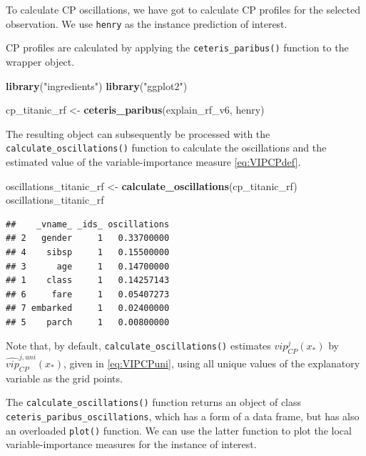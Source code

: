 \documentclass[12pt,]{krantz}
\newenvironment{Shaded}{\begin{snugshade}}{\end{snugshade}}
\newcommand{\KeywordTok}[1]{\textcolor[rgb]{0.13,0.29,0.53}{\textbf{#1}}}
\newcommand{\NormalTok}[1]{#1}
\newcommand{\StringTok}[1]{\textcolor[rgb]{0.31,0.60,0.02}{#1}}
\begin{document}
To calculate CP oscillations, we have got to calculate CP profiles for the selected observation. We use \texttt{henry} as the instance prediction of interest.

CP profiles are calculated by applying the \texttt{ceteris\_paribus()} function to the wrapper object.

\begin{Shaded}
\begin{Highlighting}[]
\KeywordTok{library}\NormalTok{(}\StringTok{"ingredients"}\NormalTok{)}
\KeywordTok{library}\NormalTok{(}\StringTok{"ggplot2"}\NormalTok{)}

\NormalTok{cp_titanic_rf <-}\StringTok{ }\KeywordTok{ceteris_paribus}\NormalTok{(explain_rf_v6, henry)}
\end{Highlighting}
\end{Shaded}

The resulting object can subsequently be processed with the \texttt{calculate\_oscillations()} function to calculate the oscillations and the estimated value of the variable-importance measure \eqref{eq:VIPCPdef}.

\begin{Shaded}
\begin{Highlighting}[]
\NormalTok{oscillations_titanic_rf <-}\StringTok{ }\KeywordTok{calculate_oscillations}\NormalTok{(cp_titanic_rf)}
\NormalTok{oscillations_titanic_rf}
\end{Highlighting}
\end{Shaded}

\begin{verbatim}
##    _vname_ _ids_ oscillations
## 2   gender     1   0.33700000
## 4    sibsp     1   0.15500000
## 3      age     1   0.14700000
## 1    class     1   0.14257143
## 6     fare     1   0.05407273
## 7 embarked     1   0.02400000
## 5    parch     1   0.00800000
\end{verbatim}

Note that, by default, \texttt{calculate\_oscillations()} estimates \(vip_{CP}^j(x_*)\) by \(\widehat{vip}_{CP}^{j,uni}(x_*)\), given in \eqref{eq:VIPCPuni}, using all unique values of the explanatory variable as the grid points.

The \texttt{calculate\_oscillations()} function returns an object of class \texttt{ceteris\_paribus\_oscillations}, which has a form of a data frame, but has also an overloaded \texttt{plot()} function. We can use the latter function to plot the local variable-importance measures for the instance of interest.
\end{document}
